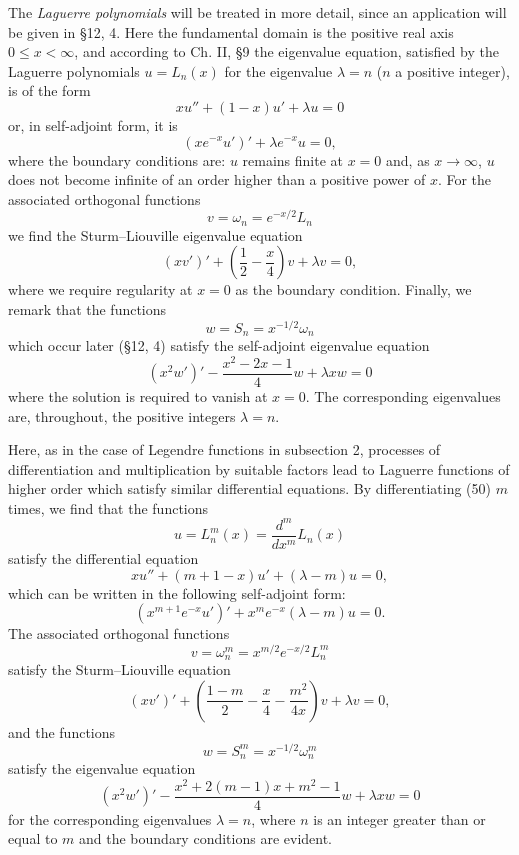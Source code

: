 The \emph{Laguerre polynomials} will be treated in more detail, since an application will be given in \S12, 4. Here the fundamental domain is the positive real axis $0\le x<\infty$, and according to Ch. II, \S9 the eigenvalue equation, satisfied by the Laguerre polynomials $u=L_n(x)$ for the eigenvalue $\lambda=n$ ($n$ a positive integer), is of the form
\begin{equation}
xu''+(1-x)u'+\lambda u=0
\tag{50}
\end{equation}
or, in self-adjoint form, it is
\[
(xe^{-x}u')'+\lambda e^{-x}u=0,
\]
where the boundary conditions are: $u$ remains finite at $x=0$ and, as $x\to\infty$, $u$ does not become infinite of an order higher than a positive power of $x$. For the associated orthogonal functions
\[
v=\omega_n=e^{-x/2}L_n
\]
we find the Sturm--Liouville eigenvalue equation
\[
(xv')'+\left(\frac12-\frac{x}{4}\right)v+\lambda v=0,
\]
where we require regularity at $x=0$ as the boundary condition. Finally, we remark that the functions
\[
w=S_n=x^{-1/2}\omega_n
\]
which occur later (\S12, 4) satisfy the self-adjoint eigenvalue equation
\[
(x^2w')'-\frac{x^2-2x-1}{4}w+\lambda xw=0
\]
where the solution is required to vanish at $x=0$. The corresponding eigenvalues are, throughout, the positive integers $\lambda=n$.

Here, as in the case of Legendre functions in subsection 2, processes of differentiation and multiplication by suitable factors lead to Laguerre functions of higher order which satisfy similar differential equations. By differentiating (50) $m$ times, we find that the functions
\[
u=L_n^m(x)=\frac{d^m}{dx^m}L_n(x)
\]
satisfy the differential equation
\begin{equation}
xu''+(m+1-x)u'+(\lambda-m)u=0,
\tag{51}
\end{equation}
which can be written in the following self-adjoint form:
\[
(x^{m+1}e^{-x}u')'+x^me^{-x}(\lambda-m)u=0.
\]
The associated orthogonal functions
\[
v=\omega_n^m=x^{m/2}e^{-x/2}L_n^m
\]
satisfy the Sturm--Liouville equation
\begin{equation}
(xv')'+\left(\frac{1-m}{2}-\frac{x}{4}-\frac{m^2}{4x}\right)v+\lambda v=0,
\tag{51a}
\end{equation}
and the functions
\[
w=S_n^m=x^{-1/2}\omega_n^m
\]
satisfy the eigenvalue equation
\begin{equation}
(x^2w')'-\frac{x^2+2(m-1)x+m^2-1}{4}w+\lambda xw=0
\tag{51b}
\end{equation}
for the corresponding eigenvalues $\lambda=n$, where $n$ is an integer greater than or equal to $m$ and the boundary conditions are evident.

